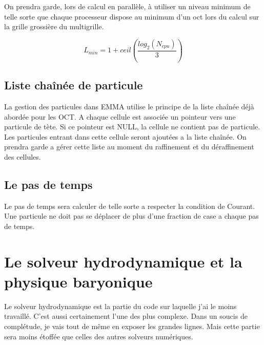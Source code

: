 On prendra garde, lors de calcul en parallèle, à utiliser un niveau minimum de telle sorte que chaque processeur dispose au minimum d'un oct lors du calcul sur la grille grossière du multigrille.

\begin{equation}
L_{min} = 1 + ceil \left(\frac{log_2(N_{cpu})}{3}  \right) 
\end{equation}


\subsection{Liste chaînée de particule}
\label{sec:chainepart}
La gestion des particules dans EMMA utilise le principe de la liste chaînée déjà abordée pour les OCT. %
A chaque cellule est associée  un pointeur vers une particule de tète.
Si ce pointeur est NULL, la cellule ne contient pas de particule.
Les particules entrant dans cette cellule seront ajoutées a la liste chaînée.
On prendra garde a gérer cette liste au moment du raffinement et du déraffinement des cellules.



\subsection{Le pas de temps}

Le pas de temps sera calculer de telle sorte a respecter la condition de Courant.
Une particule ne doit pas se déplacer de plus d'une fraction de case a chaque pas de temps.


%




\clearpage
\section{Le solveur hydrodynamique et la physique baryonique}


Le solveur hydrodynamique est la partie du code sur laquelle j'ai le moins travaillé.
C'est aussi certainement l'une des plus complexe.
Dans un soucis de complétude, je vais tout de même en exposer les grandes lignes.
Mais cette partie sera moins étoffée que celles des autres solveurs numériques.


